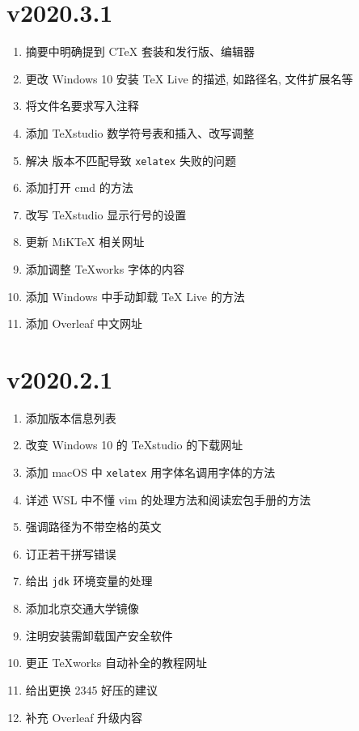 \section*{v2020.3.1}

\begin{enumerate}
    \item 摘要中明确提到 C\TeX{} 套装和发行版、编辑器
    \item 更改 Windows 10 安装 \TeX{} Live 的描述, 如路径名, 文件扩展名等
    \item 将文件名要求写入注释
    \item 添加 \TeX studio 数学符号表和插入、改写调整
    \item 解决 \LaTeXe 版本不匹配导致 \texttt{xelatex} 失败的问题
    \item 添加打开 \textsf{cmd} 的方法
    \item 改写 \TeX studio 显示行号的设置
    \item 更新 MiK\TeX{} 相关网址
    \item 添加调整 \TeX works 字体的内容
    \item 添加 Windows 中手动卸载 \TeX{} Live 的方法
    \item 添加 Overleaf 中文网址
\end{enumerate}

\section*{v2020.2.1}

\begin{enumerate}
    \item 添加版本信息列表
    \item 改变 Windows 10 的 \TeX studio 的下载网址
    \item 添加 macOS 中 \texttt{xelatex} 用字体名调用字体的方法
    \item 详述 WSL 中不懂 vim 的处理方法和阅读宏包手册的方法
    \item 强调路径为不带空格的英文
    \item 订正若干拼写错误
    \item 给出 \texttt{jdk} 环境变量的处理
    \item 添加北京交通大学镜像
    \item 注明安装需卸载国产安全软件
    \item 更正 \TeX works 自动补全的教程网址
    \item 给出更换 2345 好压的建议
    \item 补充 Overleaf 升级内容
\end{enumerate}